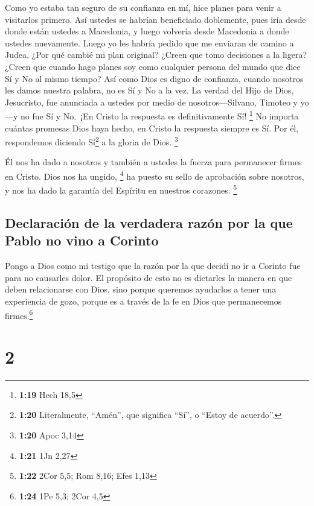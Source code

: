  Como yo estaba tan seguro de su confianza en mí, hice
planes para venir a visitarlos primero. Así ustedes se habrían
beneficiado doblemente,  pues iría desde donde están
ustedes a Macedonia, y luego volvería desde Macedonia a donde ustedes
nuevamente. Luego yo les habría pedido que me enviaran de camino a
Judea.  ¿Por qué cambié mi plan original? ¿Creen que tomo
decisiones a la ligera? ¿Creen que cuando hago planes soy como cualquier
persona del mundo que dice Sí y No al mismo tiempo?  Así
como Dios es digno de confianza, cuando nosotros les damos nuestra
palabra, no es Sí y No a la vez.  La verdad del Hijo de
Dios, Jesucristo, fue anunciada a ustedes por medio de
nosotros---Silvano, Timoteo y yo---y no fue Sí y No.~¡En Cristo la
respuesta es definitivamente Sí! \footnote{\textbf{1:19} Hech 18,5}
 No importa cuántas promesas Dios haya hecho, en Cristo
la respuesta siempre es Sí. Por él, respondemos diciendo Sí\footnote{\textbf{1:20}
  Literalmente, ``Amén'', que significa ``Sí'', o ``Estoy de acuerdo''.}
a la gloria de Dios. \footnote{\textbf{1:20} Apoc 3,14}

 Él nos ha dado a nosotros y también a ustedes la fuerza
para permanecer firmes en Cristo. Dios nos ha ungido, \footnote{\textbf{1:21}
  1Jn 2,27}  ha puesto su sello de aprobación sobre
nosotros, y nos ha dado la garantía del Espíritu en nuestros corazones.
\footnote{\textbf{1:22} 2Cor 5,5; Rom 8,16; Efes 1,13}

\hypertarget{declaraciuxf3n-de-la-verdadera-razuxf3n-por-la-que-pablo-no-vino-a-corinto}{%
\subsection{Declaración de la verdadera razón por la que Pablo no vino a
Corinto}\label{declaraciuxf3n-de-la-verdadera-razuxf3n-por-la-que-pablo-no-vino-a-corinto}}

 Pongo a Dios como mi testigo que la razón por la que
decidí no ir a Corinto fue para no causarles dolor.  El
propósito de esto no es dictarles la manera en que deben relacionarse
con Dios, sino porque queremos ayudarlos a tener una experiencia de
gozo, porque es a través de la fe en Dios que permanecemos
firmes.\footnote{\textbf{1:24} 1Pe 5,3; 2Cor 4,5}

\hypertarget{section-1}{%
\section{2}\label{section-1}}

